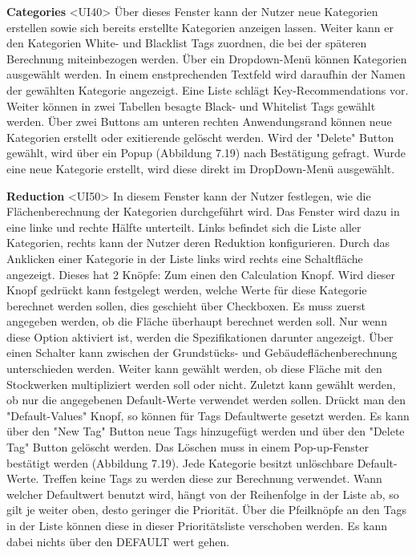 \documentclass[parskip=full]{scrartcl} %
\begin{document}
\newpage

\textbf{Categories }<UI40>
Über dieses Fenster kann der Nutzer neue Kategorien erstellen sowie sich bereits erstellte Kategorien anzeigen lassen. Weiter kann er den Kategorien White- und Blacklist Tags zuordnen, die bei der späteren Berechnung miteinbezogen werden.
Über ein Dropdown-Menü können Kategorien ausgewählt werden. In einem enstprechenden Textfeld wird daraufhin der Namen der gewählten Kategorie angezeigt. Eine Liste schlägt Key-Recommendations vor. Weiter können in zwei Tabellen besagte Black- und Whitelist Tags gewählt werden.
Über zwei Buttons am unteren rechten Anwendungsrand können neue Kategorien erstellt oder exitierende gelöscht werden. 
Wird der "Delete" Button gewählt, wird über ein Popup (Abbildung 7.19) nach Bestätigung gefragt. Wurde eine neue Kategorie erstellt, wird diese direkt im DropDown-Menü ausgewählt.

\textbf{Reduction }<UI50>
In diesem Fenster kann der Nutzer festlegen, wie die Flächenberechnung der Kategorien durchgeführt wird. Das Fenster wird dazu in eine linke und rechte Hälfte unterteilt.
Links befindet sich die Liste aller Kategorien, rechts kann der Nutzer deren Reduktion konfigurieren.
Durch das Anklicken einer Kategorie in der Liste links wird rechts eine Schaltfläche angezeigt. Dieses hat 2 Knöpfe: Zum einen den Calculation Knopf. Wird dieser Knopf gedrückt kann festgelegt werden, welche Werte für diese Kategorie berechnet werden sollen, dies geschieht über Checkboxen. Es muss zuerst angegeben werden, ob die Fläche überhaupt berechnet werden soll. Nur wenn diese Option aktiviert ist, werden die Spezifikationen darunter angezeigt. Über einen Schalter kann zwischen der Grundstücks- und Gebäudeflächenberechnung unterschieden werden. Weiter kann gewählt werden, ob diese Fläche mit den Stockwerken multipliziert werden soll oder nicht. Zuletzt kann gewählt werden, ob nur die angegebenen Default-Werte verwendet werden sollen.
Drückt man den "Default-Values" Knopf, so können für Tags Defaultwerte gesetzt werden. Es kann über den "New Tag" Button neue Tags hinzugefügt werden und über den "Delete Tag" Button gelöscht werden. Das Löschen muss in einem Pop-up-Fenster bestätigt werden (Abbildung 7.19).
Jede Kategorie besitzt unlöschbare Default-Werte. Treffen keine Tags zu werden diese zur Berechnung verwendet.
Wann welcher Defaultwert benutzt wird, hängt von der Reihenfolge in der Liste ab, so gilt je weiter oben, desto geringer die Priorität. Über die Pfeilknöpfe an den Tags in der Liste können diese in dieser Prioritätsliste verschoben werden. Es kann dabei nichts über den DEFAULT wert gehen.
\end{document}
